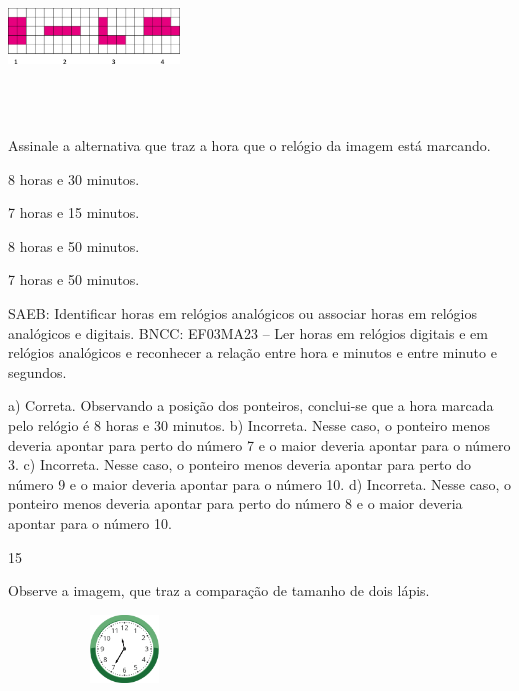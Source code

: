 \begin{escolha}
{\begin{escolha}
{%

\includegraphics[width=1.79182in,height=1.69181in]{media/image115.png}

Assinale a alternativa que traz a hora que o relógio da imagem está marcando.

\begin{escolha}
\item
  8 horas e 30 minutos.
\item
  7 horas e 15 minutos.
\item
  8 horas e 50 minutos.
\item
  7 horas e 50 minutos.
\end{escolha}

SAEB: Identificar horas em relógios analógicos ou associar
horas em relógios analógicos e digitais.
BNCC: EF03MA23 – Ler horas em relógios digitais e em relógios analógicos e reconhecer a relação
entre hora e minutos e entre minuto e segundos.


a) Correta. Observando a posição dos ponteiros, conclui-se que a hora marcada pelo
relógio é 8 horas e 30 minutos.
b) Incorreta. Nesse caso, o ponteiro menos deveria apontar para perto do número 7 e o maior deveria apontar para o número 3.
c) Incorreta. Nesse caso, o ponteiro menos deveria apontar para perto do número 9 e o maior deveria apontar para o número 10.
d) Incorreta. Nesse caso, o ponteiro menos deveria apontar para perto do número 8 e o maior deveria apontar para o número 10.

\num{15}

Observe a imagem, que traz a comparação de tamanho de dois lápis.


\includegraphics[width=2.43137in,height=0.71356in]{media/image116.png}

}
\end{escolha}}
\end{escolha}
